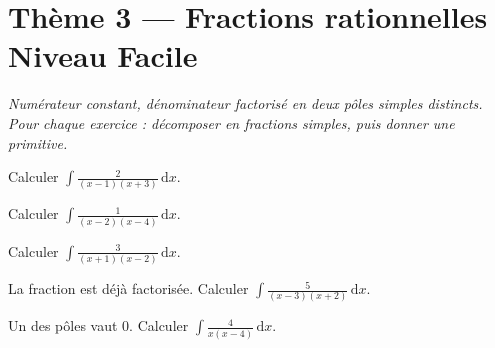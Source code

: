 \documentclass[11pt,a4paper]{article}
\newcommand{\dd}{\mathrm{d}}
\begin{document}
\section*{Thème 3 — Fractions rationnelles \quad\textbullet\quad Niveau Facile}

\begin{center}\itshape
Numérateur constant, dénominateur factorisé en deux pôles simples distincts.\\
Pour chaque exercice : décomposer en fractions simples, puis donner une primitive.
\end{center}

\begin{exo}[1]
Calculer $\displaystyle\int \frac{2}{(x-1)(x+3)}\,\dd x$.
\end{exo}

\begin{exo}[2]
Calculer $\displaystyle\int \frac{1}{(x-2)(x-4)}\,\dd x$.
\end{exo}

\begin{exo}[3]
Calculer $\displaystyle\int \frac{3}{(x+1)(x-2)}\,\dd x$.
\end{exo}

\begin{exo}[4]
La fraction est déjà factorisée. Calculer
$\displaystyle\int \frac{5}{(x-3)(x+2)}\,\dd x$.
\end{exo}

\begin{exo}[5]
Un des pôles vaut $0$. Calculer
$\displaystyle\int \frac{4}{x(x-4)}\,\dd x$.
\end{exo}
\end{document}
